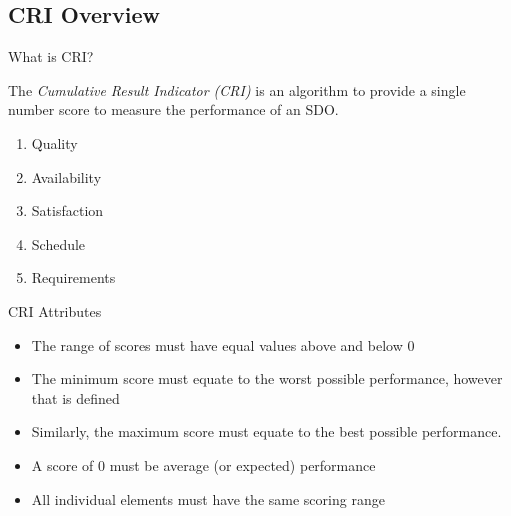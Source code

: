     \subsection{CRI Overview}
        \begin{frame}{What is CRI?}
            \begin{displayquote}
                The \textit{Cumulative Result Indicator (CRI)} is an algorithm to provide a single 
                number score to measure the performance of an SDO. 
            \end{displayquote}
            \begin{enumerate}
                \item Quality
                \item Availability
                \item Satisfaction
                \item Schedule
                \item Requirements
            \end{enumerate}
        \end{frame} 
        
        \begin{frame}{CRI Attributes}
            \begin{itemize}
                \item The range of scores must have equal values above and below 0
                \item The minimum score must equate to the worst possible 
                    performance, however that is defined
                \item Similarly, the maximum score must equate to the best possible performance.  
                \item A score of 0 must be average (or expected) performance
                \item All individual elements must have the same scoring range
            \end{itemize}
        \end{frame} 
        
